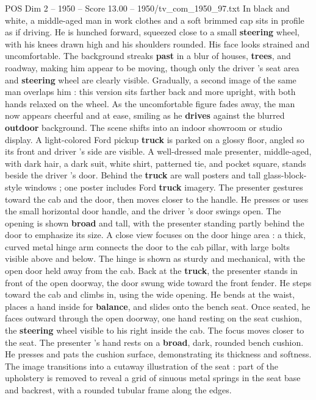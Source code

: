 \begin{textsample}{POS Dim 2 – 1950 – Score 13.00 – 1950/tv\_com\_1950\_97.txt}  \label{ex:f2_pos_086}
In black and white, a middle-aged man in work clothes and a soft brimmed cap sits in profile as if driving.
He is hunched forward, squeezed close to a small \textbf{steering} wheel, with his knees drawn high and his shoulders rounded.
His face looks strained and uncomfortable.
The background streaks \textbf{past} in a blur of houses, \textbf{trees}, and roadway, making him appear to be moving, though only the driver ’s seat area and \textbf{steering} wheel are clearly visible.
Gradually, a second image of the same man overlaps him : this version sits farther back and more upright, with both hands relaxed on the wheel.
As the uncomfortable figure fades away, the man now appears cheerful and at ease, smiling as he \textbf{drives} against the blurred \textbf{outdoor} background.
The scene shifts into an indoor showroom or studio display.
A light-colored Ford pickup \textbf{truck} is parked on a glossy floor, angled so its front and driver ’s side are visible.
A well-dressed male presenter, middle-aged, with dark hair, a dark suit, white shirt, patterned tie, and pocket square, stands beside the driver ’s door.
Behind the \textbf{truck} are wall posters and tall glass-block-style windows ; one poster includes Ford \textbf{truck} imagery.
The presenter gestures toward the cab and the door, then moves closer to the handle.
He presses or uses the small horizontal door handle, and the driver ’s door swings open.
The opening is shown \textbf{broad} and tall, with the presenter standing partly behind the door to emphasize its size.
A close view focuses on the door hinge area : a thick, curved metal hinge arm connects the door to the cab pillar, with large bolts visible above and below.
The hinge is shown as sturdy and mechanical, with the open door held away from the cab.
Back at the \textbf{truck}, the presenter stands in front of the open doorway, the door swung wide toward the front fender.
He steps toward the cab and climbs in, using the wide opening.
He bends at the waist, places a hand inside for \textbf{balance}, and slides onto the bench seat.
Once seated, he faces outward through the open doorway, one hand resting on the seat cushion, the \textbf{steering} wheel visible to his right inside the cab.
The focus moves closer to the seat.
The presenter ’s hand rests on a \textbf{broad}, dark, rounded bench cushion.
He presses and pats the cushion surface, demonstrating its thickness and softness.
The image transitions into a cutaway illustration of the seat : part of the upholstery is removed to reveal a grid of sinuous metal springs in the seat base and backrest, with a rounded tubular frame along the edges.

\end{textsample}
